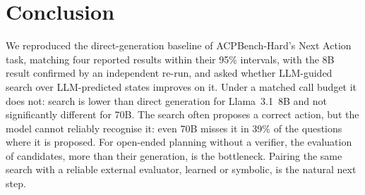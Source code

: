 \section{Conclusion}
\label{sec:conclusion}

We reproduced the direct-generation baseline of ACPBench-Hard's Next Action task, matching four reported results within their 95\% intervals, with the 8B result confirmed by an independent re-run, and
asked whether LLM-guided search over LLM-predicted states improves on it. Under a matched call
budget it does not: search is lower than direct generation for Llama~3.1~8B and not significantly different for 70B. The search often proposes a correct action, but the model cannot reliably recognise it: even 70B misses it in 39\% of the questions where it is proposed. For open-ended planning without a
verifier, the evaluation of candidates, more than their generation, is the bottleneck. Pairing the same
search with a reliable external evaluator, learned or symbolic, is the natural next step.
